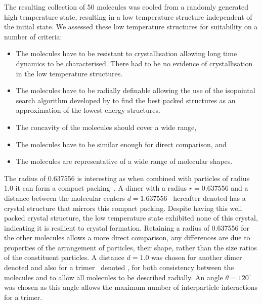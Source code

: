 The resulting collection of 50 molecules was cooled from a randomly generated high temperature state, resulting in a low temperature structure independent of the initial state. We assessed these low temperature structures for suitability on a number of criteria:
\begin{itemize}
    \item The molecules have to be resistant to crystallisation allowing long time dynamics to be characterised. There had to be no evidence of crystallisation in the low temperature structures.
    \item The molecules have to be radially definable allowing the use of the isopointal search algorithm developed by \textcite{hudson:10} to find the best packed structures as an approximation of the lowest energy structures.
    \item The concavity of the molecules should cover a wide range,
    \item The molecules have to be similar enough for direct comparison, and
    \item The molecules are representative of a wide range of molecular shapes.
\end{itemize}
The radius of 0.637556 is interesting as when combined with particles of radius $1.0$ it can form a compact packing~. A dimer with a radius $r= 0.637556$ and a distance between the molecular centers $d= 1.637556$~ hereafter denoted \dcon has a crystal structure that mirrors this compact packing. Despite \dcon having this well packed crystal structure, the low temperature state exhibited none of this crystal, indicating it is resilient to crystal formation. Retaining a radius of 0.637556 for the other molecules allows a more direct comparison, any differences are due to properties of the arrangement of particles, their shape, rather than the size ratios of the constituent particles. A distance $d= 1.0$ was chosen for another dimer~ denoted \done and also for a trimer~ denoted \tri, for both consistency between the molecules and to allow all molecules to be described radially. An angle $\theta=120^\circ$ was chosen as this angle allows the maximum number of interparticle interactions for a trimer.

